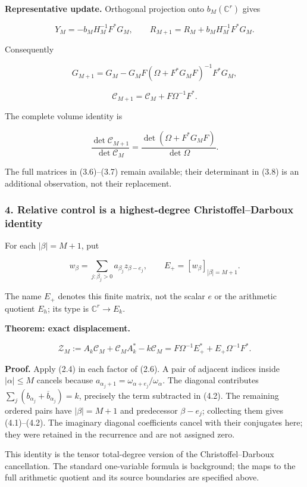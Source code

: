 \textbf{Representative update.} Orthogonal projection onto
\(b_M(\mathbb C^r)\) gives

\[\boxed{Y_M=-b_MH_M^{-1}F^*G_M,\qquad R_{M+1}=R_M+b_MH_M^{-1}F^*G_M.}\tag{3.5}\]

Consequently

\[\boxed{G_{M+1}=G_M-G_MF(\Omega+F^*G_MF)^{-1}F^*G_M,}\tag{3.6}\]

\[\boxed{\mathcal C_{M+1}=\mathcal C_M+F\Omega^{-1}F^*.}\tag{3.7}\]

The complete volume identity is

\[\frac{\det\mathcal C_{M+1}}{\det\mathcal C_M}
=\frac{\det(\Omega+F^*G_MF)}{\det\Omega}.\tag{3.8}\]

The full matrices in (3.6)--(3.7) remain available; their determinant in
(3.8) is an additional observation, not their replacement.

\subsubsection{4. Relative control is a highest-degree Christoffel--Darboux
identity}\label{symmetric_frontier:relative-control-is-a-highest-degree-christoffeldarboux-identity}

For each \(|\beta|=M+1\), put

\[w_\beta=\sum_{j:\beta_j>0}a_{\beta_j}z_{\beta-e_j},\qquad
E_+=[w_\beta]_{|\beta|=M+1}.\tag{4.1}\]

The name \(E_+\) denotes this finite matrix, not the scalar \(e\) or the
arithmetic quotient \(E_h\); its type is \(\mathbb C^r\to E_k\).

\textbf{Theorem: exact displacement.}

\[\boxed{\mathcal Z_M:=A_k\mathcal C_M+\mathcal C_MA_k^*-k\mathcal C_M
=F\Omega^{-1}E_+^*+E_+\Omega^{-1}F^*.}\tag{4.2}\]

\textbf{Proof.} Apply (2.4) in each factor of (2.6). A pair of adjacent
indices inside \(|\alpha|\le M\) cancels because
\(a_{\alpha_j+1}=\omega_{\alpha+e_j}/\omega_\alpha\). The diagonal
contributes \(\sum_j(b_{\alpha_j}+\overline b_{\alpha_j})=k\), precisely
the term subtracted in (4.2). The remaining ordered pairs have
\(|\beta|=M+1\) and predecessor \(\beta-e_j\); collecting them gives
(4.1)--(4.2). The imaginary diagonal coefficients cancel with their
conjugates here; they were retained in the recurrence and are not
assigned zero.

This identity is the tensor total-degree version of the
Christoffel--Darboux cancellation. The standard one-variable formula is
background; the maps to the full arithmetic quotient and its source
boundaries are specified above.

